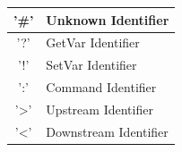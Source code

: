 \documentclass[preview]{standalone}
\begin{document}
\begin{tabular}{c|l}
    '\#' & Unknown Identifier\\
    \hline
    '?' & GetVar Identifier\\
    \hline
    '!' & SetVar Identifier\\
    \hline
    ':' & Command Identifier\\
    \hline
    '>' & Upstream Identifier\\
    \hline
    '<' & Downstream Identifier\\
\end{tabular}
\end{document}
